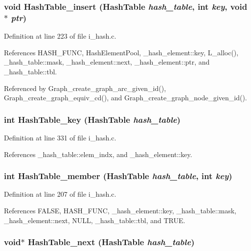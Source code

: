 \subsubsection{\setlength{\rightskip}{0pt plus 5cm}void Hash\-Table\_\-insert (\bf{Hash\-Table} {\em hash\_\-table}, int {\em key}, void $\ast$ {\em ptr})}\label{i__hash_8h_c25cfe5a8697fe45eb5dd0644d604b0c}




Definition at line 223 of file i\_\-hash.c.

References HASH\_\-FUNC, Hash\-Element\-Pool, \_\-hash\_\-element::key, L\_\-alloc(), \_\-hash\_\-table::mask, \_\-hash\_\-element::next, \_\-hash\_\-element::ptr, and \_\-hash\_\-table::tbl.

Referenced by Graph\_\-create\_\-graph\_\-arc\_\-given\_\-id(), Graph\_\-create\_\-graph\_\-equiv\_\-cd(), and Graph\_\-create\_\-graph\_\-node\_\-given\_\-id().
\subsubsection{\setlength{\rightskip}{0pt plus 5cm}int Hash\-Table\_\-key (\bf{Hash\-Table} {\em hash\_\-table})}\label{i__hash_8h_9c43b8611c01aad5912e93506fc8679b}




Definition at line 331 of file i\_\-hash.c.

References \_\-hash\_\-table::elem\_\-indx, and \_\-hash\_\-element::key.
\subsubsection{\setlength{\rightskip}{0pt plus 5cm}int Hash\-Table\_\-member (\bf{Hash\-Table} {\em hash\_\-table}, int {\em key})}\label{i__hash_8h_8f1e3168c1a6e919af2fa763326df894}




Definition at line 207 of file i\_\-hash.c.

References FALSE, HASH\_\-FUNC, \_\-hash\_\-element::key, \_\-hash\_\-table::mask, \_\-hash\_\-element::next, NULL, \_\-hash\_\-table::tbl, and TRUE.
\subsubsection{\setlength{\rightskip}{0pt plus 5cm}void$\ast$ Hash\-Table\_\-next (\bf{Hash\-Table} {\em hash\_\-table})}\label{i__hash_8h_e11b578b4892e91f3062ef6927ddd638}




